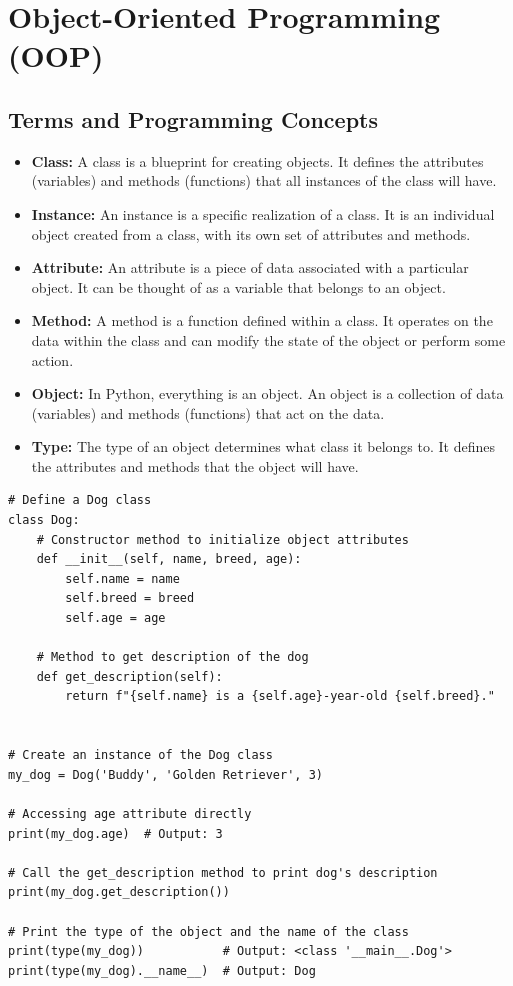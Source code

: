 \section{Object-Oriented Programming (OOP)}

\subsection{Terms and Programming Concepts}

\begin{itemize}
    \item \textbf{Class:} A class is a blueprint for creating objects. It defines the attributes (variables) and methods (functions) that all instances of the class will have.
    
    \item \textbf{Instance:} An instance is a specific realization of a class. It is an individual object created from a class, with its own set of attributes and methods.
    
    \item \textbf{Attribute:} An attribute is a piece of data associated with a particular object. It can be thought of as a variable that belongs to an object.
    
    \item \textbf{Method:} A method is a function defined within a class. It operates on the data within the class and can modify the state of the object or perform some action.
    
    \item \textbf{Object:} In Python, everything is an object. An object is a collection of data (variables) and methods (functions) that act on the data.
    
    \item \textbf{Type:} The type of an object determines what class it belongs to. It defines the attributes and methods that the object will have.
\end{itemize}

\begin{codebox}
\begin{verbatim}
# Define a Dog class
class Dog:
    # Constructor method to initialize object attributes
    def __init__(self, name, breed, age):
        self.name = name  
        self.breed = breed
        self.age = age

    # Method to get description of the dog
    def get_description(self):
        return f"{self.name} is a {self.age}-year-old {self.breed}."


# Create an instance of the Dog class
my_dog = Dog('Buddy', 'Golden Retriever', 3)

# Accessing age attribute directly
print(my_dog.age)  # Output: 3

# Call the get_description method to print dog's description
print(my_dog.get_description())

# Print the type of the object and the name of the class
print(type(my_dog))           # Output: <class '__main__.Dog'>
print(type(my_dog).__name__)  # Output: Dog
\end{verbatim}
\end{codebox}

